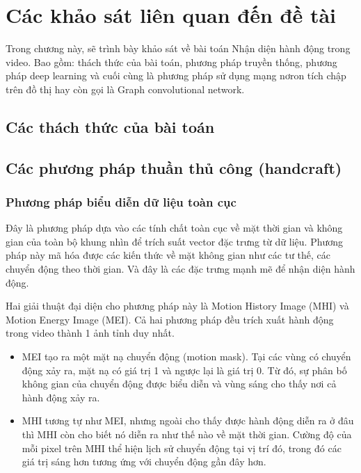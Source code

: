 \section{Các khảo sát liên quan đến đề tài}

Trong chương này, sẽ trình bày khảo sát về bài toán Nhận diện hành động trong video. Bao gồm: thách thức của bài toán, phương pháp truyền thống, phương pháp deep learning và cuối cùng là phương pháp sử dụng mạng nơron tích chập trên đồ thị hay còn gọi là Graph convolutional network.

\subsection{Các thách thức của bài toán}

\subsection{Các phương pháp thuần thủ công (handcraft)}

\subsubsection{Phương pháp biểu diễn dữ liệu toàn cục}

Đây là phương pháp dựa vào các tính chất toàn cục về mặt thời gian và không gian của toàn bộ khung nhìn để trích suất vector đặc trưng từ dữ liệu. Phương pháp này mã hóa được các kiến thức về mặt không gian như các tư thế, các chuyển động theo thời gian. Và đây là các đặc trưng mạnh mẽ để nhận diện hành động.

Hai giải thuật đại diện cho phương pháp này là Motion History Image (MHI) và Motion Energy Image (MEI). Cả hai phương pháp đều trích xuất hành động trong video thành 1 ảnh tỉnh duy nhất.

\begin{itemize}
    \item MEI tạo ra một mặt nạ chuyển động (motion mask). Tại các vùng có chuyển động xảy ra, mặt nạ có giá trị 1 và ngược lại là giá trị 0. Từ đó, sự phân bố không gian của chuyển động được biểu diễn và vùng sáng cho thấy nơi cả hành động xảy ra.
    \item MHI tương tự như MEI, nhưng ngoài cho thấy được hành động diễn ra ở đâu thì MHI còn cho biết nó diễn ra như thế nào về mặt thời gian. Cường độ của mỗi pixel trên MHI thể hiện lịch sử chuyển động tại vị trí đó, trong đó các giá trị sáng hơn tương ứng với chuyển động gần đây hơn.
\end{itemize}

